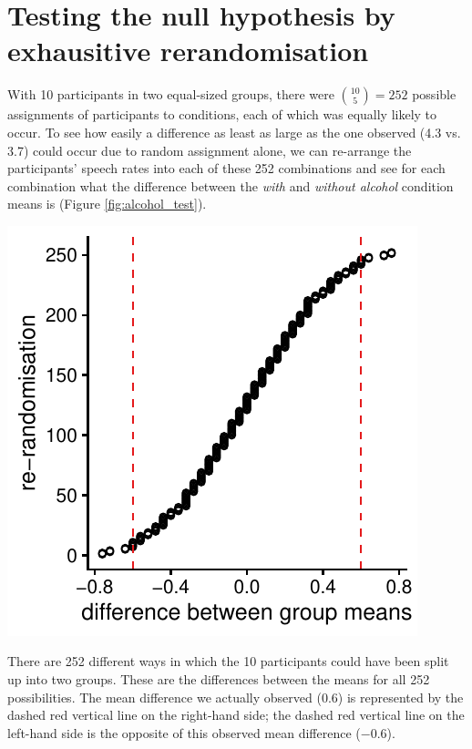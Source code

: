\documentclass[a4paper]{tufte-book}\usepackage[]{graphicx}\usepackage[]{xcolor}
\begin{document}
\section{Testing the null hypothesis by exhausitive rerandomisation}
With 10 participants in two equal-sized groups,
there were ${10 \choose 5} = 252$ possible assignments of participants to conditions,
each of which was equally likely to occur.
To see how easily a difference as least as large as the one observed (4.3 vs. 3.7) 
could occur due to random assignment alone,
we can re-arrange the participants' speech rates into each of these 252 combinations and see for each combination what the difference between the \textit{with} and
\textit{without alcohol} condition means is (Figure \ref{fig:alcohol_test}).

\begin{marginfigure}
\includegraphics[width=\textwidth]{figure/alcohol_test}
\caption{There are 252 different ways in which the 10 participants could have been split up into two groups. These are the differences between the means for all 252 possibilities.
The mean difference we actually observed (0.6) is represented by the dashed red vertical line
on the right-hand side; the dashed red vertical line on the left-hand side is the opposite
of this observed mean difference ($-0.6$).}
\label{fig:alcohol_test}
\end{marginfigure}
\end{document}
